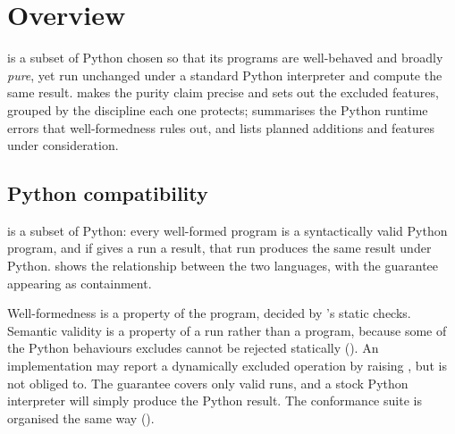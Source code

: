 \section{Overview}
\label{sec:overview}

\PurePy is a subset of Python chosen so that its programs are well-behaved and broadly \emph{pure}, yet run
unchanged under a standard Python interpreter and compute the same result.  makes the purity
claim precise and sets out the excluded features, grouped by the discipline each one protects;
 summarises the Python runtime errors that well-formedness rules out, and
 lists planned additions and features under consideration.

\subsection{Python compatibility}
\label{sec:python-compatibility}

\PurePy is a subset of Python: every well-formed program is a syntactically valid Python program, and if \PurePy
gives a run a result, that run produces the same result under Python.  shows the
relationship between the two languages, with the guarantee appearing as containment.

Well-formedness is a property of the program, decided by \PurePy's static checks. Semantic validity is
a property of a run rather than a program, because some of the Python behaviours \PurePy excludes cannot be rejected
statically (). An implementation may report a dynamically excluded operation by raising
, but is not obliged to. The guarantee covers only valid runs, and a
stock Python interpreter will simply produce the Python result. The conformance suite is organised the same
way ().

